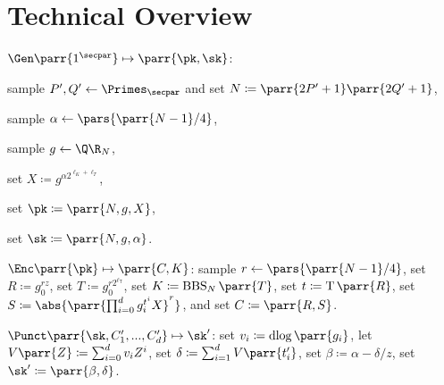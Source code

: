 \section{Technical Overview}
\label{sec:overview}

\begin{sitemize}
    \item \(\Gen\parr{1^\secpar} \mapsto \parr{\pk,\sk}\):
    \begin{sitemize}
        \item sample \(P',Q' \gets \Primes_\secpar\) and set \(N \coloneqq \parr{2P'+1} \parr{2Q'+1}\),
        \item sample \(\alpha \gets \pars{\parr{N-1}/4}\),
        \item sample \(g \gets \Q\R_N\),
        \item set \(X \coloneqq g^{\alpha 2^{\ell_K+\ell_T}}\),
        \item set \(\pk \coloneqq \parr{N,g,X}\),
        \item set \(\sk \coloneqq \parr{N,g,\alpha}\).
    \end{sitemize}
    
    \item \(\Enc\parr{\pk} \mapsto \parr{C,K}\):
    sample \(r \gets \pars{\parr{N-1}/4}\),
    set \(R \coloneqq g_0^{r z}\),
    set \(T \coloneqq g_0^{r 2^{\ell_{\mathsf{T}}}}\),
    set \(K \coloneqq \operatorname{BBS}_N\parr{T}\),
    set \(t \coloneqq \operatorname{T}\parr{R}\),
    set \(S \coloneqq \abs{\parr{\prod_{i=0}^d g_i^{t^i} X}^r}\),
    and set \(C \coloneqq \parr{R,S}\).
    \item \(\Punct\parr{\sk,C'_1,...,C'_d} \mapsto \sk'\):
    set \(v_i \coloneqq \operatorname{dlog}\parr{g_i}\),
    let \(V\parr{Z} \coloneqq \sum_{i=0}^d v_i Z^i\),
    set \(\delta \coloneqq \sum_{i=1}^d V\parr{t'_i}\),
    set \(\beta \coloneqq \alpha - \delta/z\),
    set \(\sk' \coloneqq \parr{\beta, \delta}\).
\end{sitemize}






























